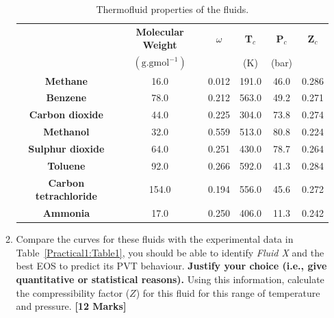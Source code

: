 \documentclass[12pts,a4paper,amsmath,amssymb,floatfix]{article}%
\begin{document}
\begin{enumerate}[label=\bfseries Problem \arabic*:]
\begin{enumerate}[label=\bfseries Task \arabic*]
\begin{table}[h]
\begin{center}
\begin{tabular}{||c | c c c c c ||} 
\hline\hline
                          & {\bf Molecular Weight}           &  {\bf $\omega$}  & {\bf T$_{c}$}  & {\bf P$_{c}$} & {\bf Z$_{c}$}  \\
                          & $\left(\text{g.gmol}^{-1}\right)$ &                  &   (K)         &   (bar)       &               \\ 
\hline
{\bf Methane}             & 16.0                             &  0.012           &  191.0         &  46.0        &    0.286      \\  
{\bf Benzene}             & 78.0                             &  0.212           &  563.0         &  49.2        &    0.271       \\  
{\bf Carbon dioxide}      & 44.0                             &  0.225           &  304.0         &  73.8        &    0.274       \\  
{\bf Methanol}            & 32.0                             &  0.559           &  513.0         &  80.8        &    0.224       \\  
{\bf Sulphur dioxide}     & 64.0                             &  0.251           &  430.0         &  78.7        &    0.264       \\  
{\bf Toluene}             & 92.0                             &  0.266           &  592.0         &  41.3        &    0.284       \\  
{\bf Carbon tetrachloride}& 154.0                            &  0.194           &  556.0         &  45.6        &    0.272       \\  
{\bf Ammonia}             & 17.0                             &  0.250           &  406.0         &  11.3        &    0.242       \\  
\hline\hline
\end{tabular}
\caption{Thermofluid properties of the fluids.}
\label{Practical1:Table2}
\end{center}
\end{table}

\item\label{Practical1:Task2} Compare the curves for these fluids with the experimental data in Table~\ref{Practical1:Table1}, you should be able to identify {\it Fluid X} and the best EOS to predict its PVT behaviour. {\bf Justify your choice (i.e., give quantitative or statistical reasons).} Using this information, calculate the compressibility factor ($Z$) for this fluid for this range of temperature and pressure. \hfill{\bf[12 Marks]}


\end{enumerate}
\end{enumerate}
\end{document}
